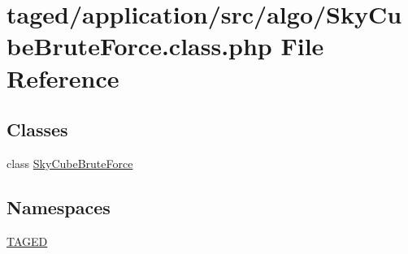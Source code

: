 \hypertarget{_sky_cube_brute_force_8class_8php}{}\section{taged/application/src/algo/\+Sky\+Cube\+Brute\+Force.class.\+php File Reference}
\label{_sky_cube_brute_force_8class_8php}
\subsection*{Classes}
\begin{DoxyCompactItemize}
\item 
class \hyperlink{class_sky_cube_brute_force}{Sky\+Cube\+Brute\+Force}
\end{DoxyCompactItemize}
\subsection*{Namespaces}
\begin{DoxyCompactItemize}
\item 
 \hyperlink{namespace_t_a_g_e_d}{T\+A\+G\+ED}
\end{DoxyCompactItemize}
